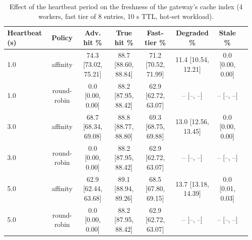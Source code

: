 \begin{table}[t]
\centering
\scriptsize
\setlength{\tabcolsep}{2.5pt}
\caption{Effect of the heartbeat period on the freshness of the gateway's cache index (4 workers, fast tier of 8 entries, 10 s TTL, hot-set workload).}
\label{tab:heartbeat-interval}
\begin{tabular}{lccccccc}
\toprule
Heartbeat (s) & Policy & Adv. hit \% & True hit \% & Fast-tier \% & Degraded \% & Stale \% \\
\midrule
1.0 & affinity & 74.3 \tiny [73.02, 75.21] & 88.7 \tiny [88.60, 88.84] & 71.2 \tiny [70.52, 71.99] & 11.4 \tiny [10.54, 12.21] & 0.0 \tiny [0.00, 0.00] \\
1.0 & round-robin & 0.0 \tiny [0.00, 0.00] & 88.2 \tiny [87.95, 88.42] & 62.9 \tiny [62.72, 63.07] & -- \tiny [--, --] & -- \tiny [--, --] \\
3.0 & affinity & 68.7 \tiny [68.34, 69.08] & 88.8 \tiny [88.77, 88.80] & 69.3 \tiny [68.75, 69.88] & 13.0 \tiny [12.56, 13.45] & 0.0 \tiny [0.00, 0.00] \\
3.0 & round-robin & 0.0 \tiny [0.00, 0.00] & 88.2 \tiny [87.95, 88.42] & 62.9 \tiny [62.72, 63.07] & -- \tiny [--, --] & -- \tiny [--, --] \\
5.0 & affinity & 62.9 \tiny [62.44, 63.68] & 89.1 \tiny [88.94, 89.26] & 68.5 \tiny [67.80, 69.15] & 13.7 \tiny [13.18, 14.39] & 0.0 \tiny [0.01, 0.03] \\
5.0 & round-robin & 0.0 \tiny [0.00, 0.00] & 88.2 \tiny [87.95, 88.42] & 62.9 \tiny [62.72, 63.07] & -- \tiny [--, --] & -- \tiny [--, --] \\
\bottomrule
\end{tabular}
\end{table}
